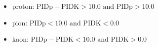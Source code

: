 \begin{itemize}
\item proton: $\text{PIDp} - \text{PIDK} > 10.0 \text{ and } \text{PIDp} > 10.0$
\item pion: $\text{PIDp} < 10.0 \text{ and } \text{PIDK} < 0.0$
\item kaon: $\text{PIDp} - \text{PIDK} < 10.0 \text{ and } \text{PIDK} > 0.0$
\end{itemize}